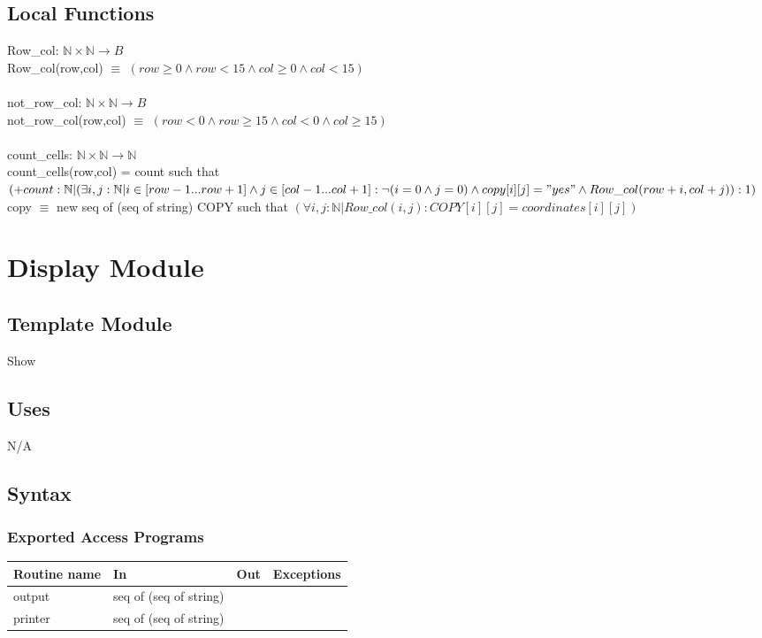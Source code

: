 \documentclass[12pt]{article}
\begin{document}
\subsection*{Local Functions}

Row\_col: $\mathbb{N} \times \mathbb{N} \rightarrow B$\\
Row\_col(row,col) $\equiv$ $(row \ge 0 \land row < 15 \land col \ge 0 \land col < 15)$\\ \\
not\_row\_col: $\mathbb{N} \times \mathbb{N} \rightarrow B$\\
not\_row\_col(row,col) $\equiv$ $(row < 0 \land row \ge 15 \land col < 0 \land col \ge 15)$\\ \\
count\_cells: $\mathbb{N} \times \mathbb{N} \rightarrow \mathbb{N}$\\
count\_cells(row,col) = count such that $(+count:\mathbb{N} | (\exists i,j : \mathbb{N} | i \in [row - 1 ... row + 1] \land j \in [col - 1 ... col + 1]: \lnot (i = 0 \land j = 0) \land copy[i][j] = "yes" \land Row\_col(row+i, col+j)):1)$\\
copy $\equiv$ new seq of (seq of string) COPY such that $(\forall i,j : \mathbb{N} | Row\_col(i,j) : COPY[i][j] = coordinates[i][j])$


\newpage
\section* {Display Module}

\subsection*{Template Module}

Show

\subsection*{Uses}

N/A

\subsection* {Syntax}

\subsubsection* {Exported Access Programs}

\begin{tabular}{| l | l | l | l |}
\hline
\textbf{Routine name} & \textbf{In} & \textbf{Out} & \textbf{Exceptions}\\
\hline
output & seq of (seq of string) &&\\
\hline
printer & seq of (seq of string) && \\
\hline
\end{tabular}
\end{document}
